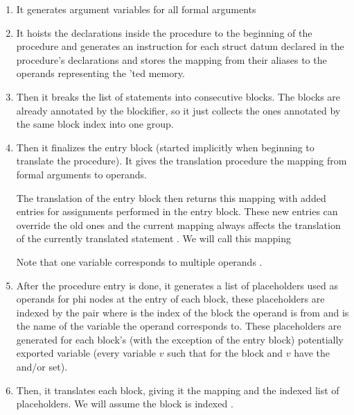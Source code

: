 \begin{enumerate}
    \item It generates argument variables for all formal arguments

    \item It hoists the declarations inside the procedure to the beginning of the procedure and generates an  instruction for each struct datum declared in the procedure's  declarations and stores the mapping from their aliases to the operands representing the 'ted memory.
    
    \item Then it breaks the list of statements into consecutive blocks. The blocks are already annotated by the blockifier, so it just collects the ones annotated by the same block index into one group.
    
    \item Then it finalizes the entry block (started implicitly when beginning to translate the procedure). It gives the translation procedure the mapping from formal arguments to operands.
    
    
    The translation of the entry block then returns this mapping with added entries for assignments performed in the entry block. These new entries can override the old ones and the current mapping always affects the translation of the currently translated statement . We will call this mapping 
    
    Note that one variable corresponds to multiple operands . 

    \item After the procedure entry is done, it generates a list  of placeholders used as operands for phi nodes at the entry of each block, these placeholders are indexed by the pair  where  is the index of the block the operand is from and  is the name of the variable the operand corresponds to. These placeholders are generated for each block's (with the exception of the entry block) potentially exported variable (every variable $v$ such that  for the block and $v$ have the  and/or  set).
    
    \item Then, it translates each block, giving it the  mapping and the indexed list of placeholders. We will assume the block is indexed .
    

\end{enumerate}
